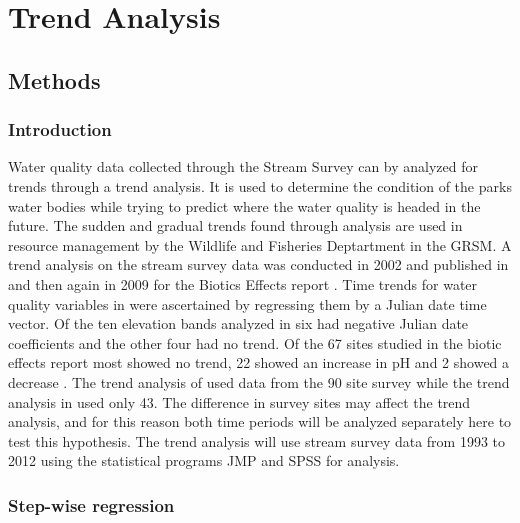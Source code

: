 \chapter{Trend Analysis}\label{ch:TA}

\section{Methods}

\subsection{Introduction}

Water quality data collected through the Stream Survey can by analyzed for trends through a trend analysis.
It is used to determine the condition of the parks water bodies while trying to predict where the water quality is headed in the future. 
The sudden and gradual trends found through analysis are used in resource management by the Wildlife and Fisheries Deptartment in the GRSM.
A trend analysis on the stream survey data was conducted in 2002 and published in \citet{robinson2008ph} and then again in 2009 for the Biotics Effects report \citep{cai2013}.
Time trends for water quality variables  in \citet{robinson2008ph} were ascertained by regressing them by a Julian date time vector.
Of the ten elevation bands analyzed in \citet{robinson2008ph} six had negative Julian date coefficients and the other four had no trend. 
Of the 67 sites studied in the biotic effects report most showed no trend, 22 showed an increase in pH and 2 showed a decrease \citep{cai2013}. 
The trend analysis of \citet{robinson2008ph} used data from the 90 site survey while the trend analysis in \citet{cai2013} used only 43.
The difference in survey sites may affect the trend analysis, and for this reason both time periods will be analyzed separately here to test this hypothesis.
The trend analysis will use stream survey data from 1993 to 2012 using the statistical programs JMP and SPSS for analysis.

\subsection{Step-wise regression}

